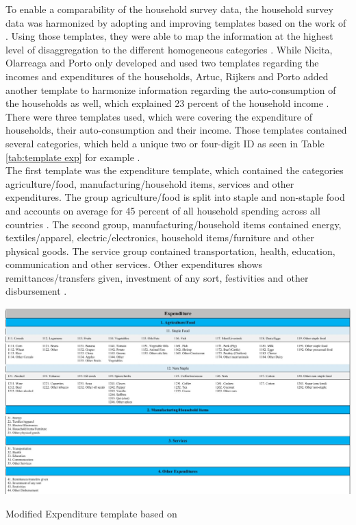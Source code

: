 To enable a comparability of the household survey data, the household survey data was harmonized by adopting and improving templates based 
on the work of \cite{Nicita.2014}. Using those templates, they were able to map the information at the highest 
level of disaggregation to the different homogeneous categories \autocite[p.~255]{Nicita.2014}.
While Nicita, Olarreaga and Porto only developed and used two templates regarding the incomes and expenditures of the households, Artuc, Rijkers
and Porto added another template to harmonize information regarding the auto-consumption of the households as well, which explained 23 percent
of the household income \autocites[p.~255]{Nicita.2014}[p.~11]{Artuc.2019}.\\
There were three templates used, which were covering the expenditure of households, their auto-consumption and their income. Those templates 
contained several categories, which held a unique two or four-digit ID as seen in Table \ref{tab:template exp} for example \Autocite[p.~10]{Artuc.2019}.\\
The first template was the expenditure template, which contained the categories agriculture/food, manufacturing/household items, services 
and other expenditures. The group agriculture/food is split into staple and non-staple food and accounts on average for 45 percent of all 
household spending across all countries \autocite[p.~12]{Artuc.2019}. The second group, manufacturing/household items contained energy, 
textiles/apparel, electric/electronics, household items/furniture and other physical goods. The service group contained transportation, health,
education, communication and other services. Other expenditures shows remittances/transfers given, investment of any sort, festivities and 
other disbursement \parencite[p.~58]{Artuc.2019}.\\
\begin{table}[h!]
    \centering
    \includegraphics*[width=\textwidth]{graphics/templ1.jpg}
    \caption{Modified Expenditure template based on \cite{Nicita.2014}\parencite[p.~58]{Artuc.2019}}
    \label{tab:template exp}
\end{table}\\
